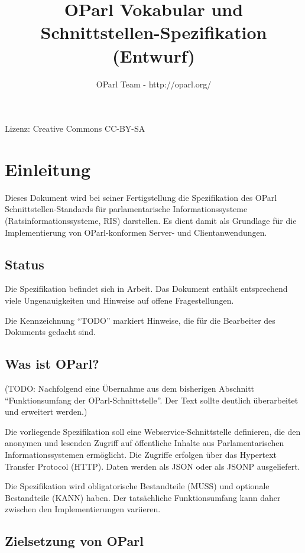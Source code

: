 \documentclass[,a4paper]{article}
\title{OParl Vokabular und Schnittstellen-Spezifikation (Entwurf)}
\author{OParl Team - http://oparl.org/}
\date{}
\begin{document}
\maketitle

Lizenz: Creative Commons CC-BY-SA

\section{Einleitung}\label{einleitung}

Dieses Dokument wird bei seiner Fertigstellung die Spezifikation des
OParl Schnittstellen-Standards für parlamentarische Informationssysteme
(Ratsinformationssysteme, RIS) darstellen. Es dient damit als Grundlage
für die Implementierung von OParl-konformen Server- und
Clientanwendungen.

\subsection{Status}\label{status}

Die Spezifikation befindet sich in Arbeit. Das Dokument enthält
entsprechend viele Ungenauigkeiten und Hinweise auf offene
Fragestellungen.

Die Kennzeichnung ``TODO'' markiert Hinweise, die für die Bearbeiter des
Dokuments gedacht sind.

\subsection{Was ist OParl?}\label{was-ist-oparl}

(TODO: Nachfolgend eine Übernahme aus dem bisherigen Abschnitt
``Funktionsumfang der OParl-Schnittstelle''. Der Text sollte deutlich
überarbeitet und erweitert werden.)

Die vorliegende Spezifikation soll eine Webservice-Schnittstelle
definieren, die den anonymen und lesenden Zugriff auf öffentliche
Inhalte aus Parlamentarischen Informationssystemen ermöglicht. Die
Zugriffe erfolgen über das Hypertext Transfer Protocol (HTTP). Daten
werden als JSON oder als JSONP ausgeliefert.

Die Spezifikation wird obligatorische Bestandteile (MUSS) und optionale
Bestandteile (KANN) haben. Der tatsächliche Funktionsumfang kann daher
zwischen den Implementierungen variieren.

\subsection{Zielsetzung von OParl}\label{zielsetzung-von-oparl}
\end{document}
